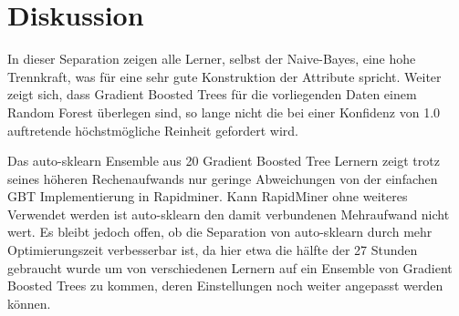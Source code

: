 \section{Diskussion}
\label{sec:Diskussion}

In dieser Separation zeigen alle Lerner, selbst der Naive-Bayes, eine hohe Trennkraft, was für eine sehr gute Konstruktion der Attribute spricht.
Weiter zeigt sich, dass Gradient Boosted Trees für die vorliegenden Daten einem Random Forest überlegen sind, so lange nicht die bei einer Konfidenz von 1.0 auftretende höchstmögliche Reinheit gefordert wird.

Das auto-sklearn Ensemble aus 20 Gradient Boosted Tree Lernern zeigt trotz seines höheren Rechenaufwands nur geringe Abweichungen von der einfachen GBT Implementierung in Rapidminer.
Kann RapidMiner ohne weiteres Verwendet werden ist auto-sklearn den damit verbundenen Mehraufwand nicht wert.
Es bleibt jedoch offen, ob die Separation von auto-sklearn durch mehr Optimierungszeit verbesserbar ist, da hier etwa die hälfte der 27 Stunden gebraucht wurde um von verschiedenen Lernern auf ein Ensemble von Gradient Boosted Trees zu kommen, deren Einstellungen noch weiter angepasst werden können.

